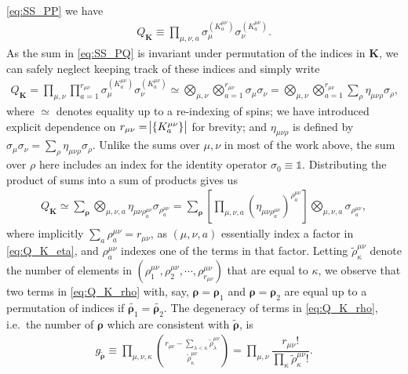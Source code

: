 \documentclass[aps,notitlepage,nofootinbib,11pt]{revtex4-1}
\newcommand{\f}[2]{\dfrac{#1}{#2}} %
\newcommand{\p}[1]{\left(#1\right)} %
\renewcommand{\sp}[1]{\left[#1\right]} %
\renewcommand{\set}[1]{\left\{#1\right\}} %
\renewcommand{\v}{\bm} %
\newcommand{\1}{\mathds{1}}
\begin{document}
\eqref{eq:SS_PP} we have
\begin{align}
  Q_{\v K} \equiv \prod_{\mu,\nu,a}
  \sigma_\mu^{(K^{\mu\nu}_a)} \sigma_\nu^{(K^{\mu\nu}_a)}.
\end{align}
As the sum in \eqref{eq:SS_PQ} is invariant under permutation of the
indices in $\v K$, we can safely neglect keeping track of these
indices and simply write
\begin{align}
  Q_{\v K}
  = \prod_{\mu,\nu} \prod_{a=1}^{r_{\mu\nu}}
  \sigma_\mu^{(K^{\mu\nu}_a)} \sigma_\nu^{(K^{\mu\nu}_a)}
  \simeq \bigotimes_{\mu,\nu} \bigotimes_{a=1}^{r_{\mu\nu}}
  \sigma_\mu \sigma_\nu
  = \bigotimes_{\mu,\nu} \bigotimes_{a=1}^{r_{\mu\nu}}
  \sum_\rho \eta_{\mu\nu\rho} \sigma_\rho,
  \label{eq:Q_K_eta}
\end{align}
where $\simeq$ denotes equality up to a re-indexing of spins; we have
introduced explicit dependence on
$r_{\mu\nu}=\abs{\set{K^{\mu\nu}_a}}$ for brevity; and
$\eta_{\mu\nu\rho}$ is defined by
$\sigma_\mu\sigma_\nu=\sum_\rho\eta_{\mu\nu\rho}\sigma_\rho$.  Unlike
the sums over $\mu,\nu$ in most of the work above, the sum over $\rho$
here includes an index for the identity operator $\sigma_0\equiv\1$.
Distributing the product of sums into a sum of products gives us
\begin{align}
  Q_{\v K}
  \simeq \sum_{\v\rho} \bigotimes_{\mu,\nu,a}
  \eta_{\mu\nu\rho^{\mu\nu}_a} \sigma_{\rho^{\mu\nu}_a}
  = \sum_{\v\rho} \sp{\prod_{\mu,\nu,a}
    \p{\eta_{\mu\nu\rho^{\mu\nu}_a}}^{\rho^{\mu\nu}_a}}
  \bigotimes_{\mu,\nu,a} \sigma_{\rho^{\mu\nu}_a},
  \label{eq:Q_K_rho}
\end{align}
where implicitly $\sum_a\rho^{\mu\nu}_a=r_{\mu\nu}$, as
$\p{\mu,\nu,a}$ essentially index a factor in \eqref{eq:Q_K_eta}, and
$\rho^{\mu\nu}_a$ indexes one of the terms in that factor.  Letting
$\tilde\rho^{\mu\nu}_\kappa$ denote the number of elements in
$\p{\rho^{\mu\nu}_1,\rho^{\mu\nu}_2,\cdots,\rho^{\mu\nu}_{r_{\mu\nu}}}$
that are equal to $\kappa$, we observe that two terms in
\eqref{eq:Q_K_rho} with, say, $\v\rho=\v\rho_1$ and $\v\rho=\v\rho_2$
are equal up to a permutation of indices if
$\tilde{\v\rho_1}=\tilde{\v\rho_2}$.  The degeneracy of terms in
\eqref{eq:Q_K_rho}, i.e.~the number of $\v\rho$ which are consistent
with $\tilde{\v\rho}$, is
\begin{align}
  g_{\tilde{\v\rho}}
  \equiv \prod_{\mu,\nu,\kappa}
  { r_{\mu\nu} - \sum_{\lambda<\kappa} \tilde\rho^{\mu\nu}_\lambda
    \choose \tilde\rho^{\mu\nu}_\kappa }
  = \prod_{\mu,\nu}
  \f{r_{\mu\nu}!}{\prod_\kappa\tilde\rho^{\mu\nu}_\kappa!}.
\end{align}
\end{document}
